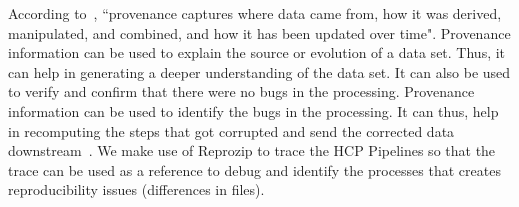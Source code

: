 According to~\cite{Ikeda:2010:PSP:1855795.1855800}, ``provenance captures where data came from, how it was derived, manipulated, and combined, and how it has been updated over time". Provenance information can be used to explain the source or evolution of a data set. Thus, it can help in generating a deeper understanding of the data set. It can also be used to verify and confirm that there were no bugs in the processing. Provenance information can be used to identify the bugs in the processing. It can thus, help in recomputing the steps that got corrupted and send the corrected data downstream~\cite{Ikeda:2010:PSP:1855795.1855800}. We make use of Reprozip to trace the HCP Pipelines so that the trace can be used as a reference to debug and identify the processes that creates reproducibility issues (differences in files).
